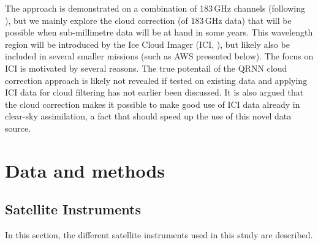 \documentclass[amt, manuscript]{copernicus}
\begin{document}
The approach is demonstrated on a combination of 183\,GHz channels (following
\citet{buehler:aclou:07}), but we mainly explore the cloud correction (of
183\,GHz data) that will be possible when sub-millimetre data will be at hand
in some years. This wavelength region will be introduced by the Ice Cloud
Imager (ICI, \citet{eriksson:towar:20}), but likely also be included in several
smaller missions (such as AWS presented below). The focus on ICI is motivated
by several reasons. The true potentail of the QRNN cloud correction approach is
likely not revealed if tested on existing data and applying ICI data for cloud
filtering has not earlier been discussed. It is also argued that the cloud
correction makes it possible to make good use of ICI data already in clear-sky
assimilation, a fact that should speed up the use of this novel data source.

\section{Data and methods}
%
\subsection{Satellite Instruments}
In this section, the different satellite instruments used in this study are described.
\end{document}
